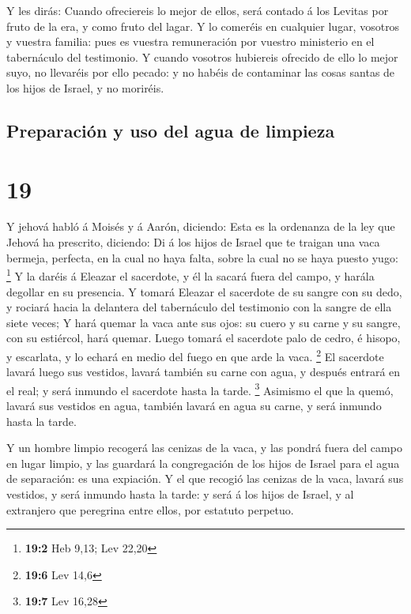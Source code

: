  Y les dirás: Cuando ofreciereis lo mejor de ellos, será
contado á los Levitas por fruto de la era, y como fruto del lagar.
 Y lo comeréis en cualquier lugar, vosotros y vuestra
familia: pues es vuestra remuneración por vuestro ministerio en el
tabernáculo del testimonio.  Y cuando vosotros hubiereis
ofrecido de ello lo mejor suyo, no llevaréis por ello pecado: y no
habéis de contaminar las cosas santas de los hijos de Israel, y no
moriréis.

\hypertarget{preparaciuxf3n-y-uso-del-agua-de-limpieza}{%
\subsection{Preparación y uso del agua de
limpieza}\label{preparaciuxf3n-y-uso-del-agua-de-limpieza}}

\hypertarget{section-18}{%
\section{19}\label{section-18}}

 Y jehová habló á Moisés y á Aarón, diciendo: 
Esta es la ordenanza de la ley que Jehová ha prescrito, diciendo: Di á
los hijos de Israel que te traigan una vaca bermeja, perfecta, en la
cual no haya falta, sobre la cual no se haya puesto yugo: \footnote{\textbf{19:2}
  Heb 9,13; Lev 22,20}  Y la daréis á Eleazar el sacerdote,
y él la sacará fuera del campo, y harála degollar en su presencia.
 Y tomará Eleazar el sacerdote de su sangre con su dedo, y
rociará hacia la delantera del tabernáculo del testimonio con la sangre
de ella siete veces;  Y hará quemar la vaca ante sus ojos:
su cuero y su carne y su sangre, con su estiércol, hará quemar.
 Luego tomará el sacerdote palo de cedro, é hisopo, y
escarlata, y lo echará en medio del fuego en que arde la vaca.
\footnote{\textbf{19:6} Lev 14,6}  El sacerdote lavará luego
sus vestidos, lavará también su carne con agua, y después entrará en el
real; y será inmundo el sacerdote hasta la tarde. \footnote{\textbf{19:7}
  Lev 16,28}  Asimismo el que la quemó, lavará sus vestidos
en agua, también lavará en agua su carne, y será inmundo hasta la tarde.

 Y un hombre limpio recogerá las cenizas de la vaca, y las
pondrá fuera del campo en lugar limpio, y las guardará la congregación
de los hijos de Israel para el agua de separación: es una expiación.
 Y el que recogió las cenizas de la vaca, lavará sus
vestidos, y será inmundo hasta la tarde: y será á los hijos de Israel, y
al extranjero que peregrina entre ellos, por estatuto perpetuo.

